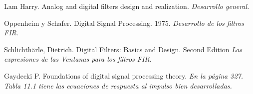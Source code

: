 \documentclass[informe.tex]{subfiles}
\begin{document}
Lam Harry. Analog and digital filters design and realization.\newline 
\tab[1cm]\textit{Desarrollo general.}\newline

Oppenheim y Schafer. Digital Signal Processing. 1975.\newline
\tab[1cm]\textit{Desarrollo de los filtros FIR.}\newline

Schlichthärle, Dietrich. Digital Filters: Basics and Design. Second Edition\newline
\tab[1cm]\textit{Las expresiones de las Ventanas para los filtros FIR.}\newline

Gaydecki P. Foundations of digital signal processing theory.\newline
\tab[1cm]\textit{En la página 327. Tabla 11.1 tiene las ecuaciones de respuesta al impulso bien desarrolladas.}\newline
\end{document}
